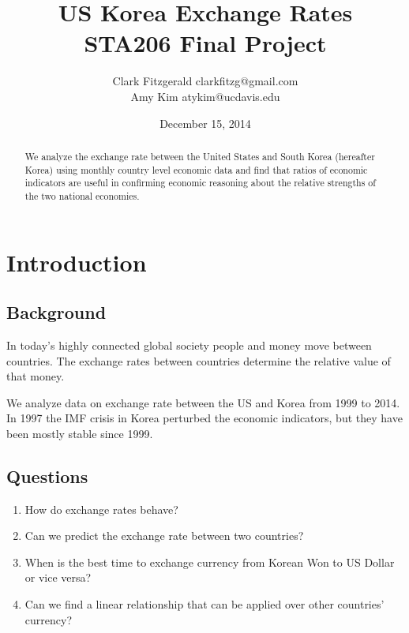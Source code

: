 \documentclass[12pt]{article}
\begin{document}
\title{US Korea Exchange Rates \\ STA206 Final Project}
\date{December 15, 2014}
\author{Clark Fitzgerald clarkfitzg@gmail.com \\ 
        Amy Kim atykim@ucdavis.edu}

\maketitle

\begin{abstract}

    We analyze the exchange rate between the United States and South Korea
    (hereafter Korea) using monthly country level economic data and find
    that ratios of economic indicators are useful in confirming economic
    reasoning about the relative strengths of the two national economies.

\end{abstract}

\section{Introduction}

\subsection{Background}

In today's highly connected global society people and money move between
countries. The exchange rates between countries determine the relative
value of that money.

We analyze data on exchange rate between the US and Korea from 1999 to
2014. In 1997 the IMF crisis in Korea perturbed the economic indicators,
but they have been mostly stable since 1999.

\subsection{Questions}

\begin{enumerate}

    \item How do exchange rates behave?

    \item Can we predict the exchange rate between two countries?  

    \item When is the best time to exchange currency from Korean Won
        to US Dollar or vice versa?  

    \item Can we find a linear relationship
        that can be applied over other countries' currency? 

\end{enumerate}
\end{document}
